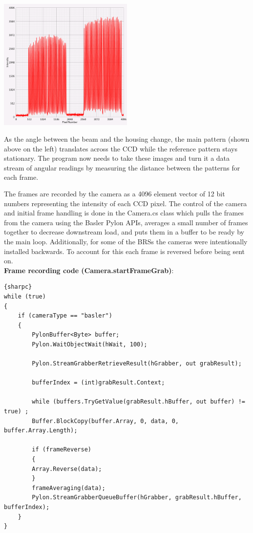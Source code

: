 \documentclass{article}
\begin{document}
\begin{center}
\includegraphics[width=0.5\textwidth]{BRSReadoutScreenPatterns.png}\\
\end{center}

As the angle between the beam and the housing change, the main pattern (shown above on the left) translates across the CCD while the reference pattern stays stationary. The program now needs to take these images and turn it a data stream of angular readings by measuring the distance between the patterns for each frame.

The frames are recorded by the camera as a 4096 element vector of 12 bit numbers representing the intensity of each CCD pixel. The control of the camera and initial frame handling is done in the Camera.cs class which pulls the frames from the camera using the Basler Pylon APIs, averages a small number of frames together to decrease downstream load, and puts them in a buffer to be ready by the main loop. Additionally, for some of the BRSs the cameras were intentionally installed backwards. To account for this each frame is reversed before being sent on.\\

\textbf{Frame recording code (Camera.startFrameGrab)}:
\begin{lstlisting}{sharpc}
while (true)
{
	if (cameraType == "basler")
	{
	    PylonBuffer<Byte> buffer;
	    Pylon.WaitObjectWait(hWait, 100);

	    Pylon.StreamGrabberRetrieveResult(hGrabber, out grabResult);

	    bufferIndex = (int)grabResult.Context;

	    while (buffers.TryGetValue(grabResult.hBuffer, out buffer) != true) ;
	    Buffer.BlockCopy(buffer.Array, 0, data, 0, buffer.Array.Length);

	    if (frameReverse)
	    {
		Array.Reverse(data);
	    }
	    frameAveraging(data);
	    Pylon.StreamGrabberQueueBuffer(hGrabber, grabResult.hBuffer, bufferIndex);
	}
}
\end{lstlisting}
\end{document}
